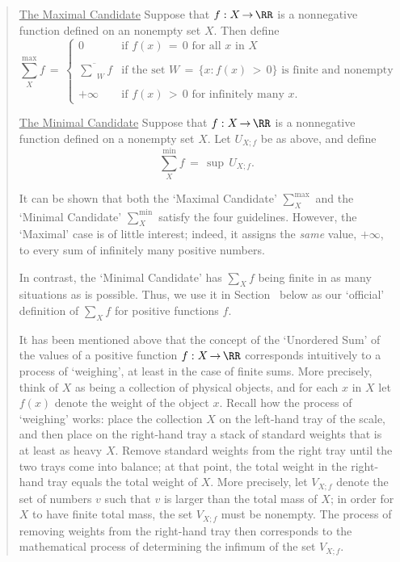 \begin{quotation}
{        \underline{The Maximal Candidate} Suppose that $f:X \,{\rightarrow}\, {\RR}$ is a nonnegative function defined on an nonempty set $X$.
    Then define
        \begin{displaymath}
        {\sum}_{X}^{\mbox{max}} f \,=\, \left\{
        \begin{array}{cl}
        0 & \mbox{if $f(x) \,=\, 0$ for all $x$ in $X$} \\
          &                                             \\
        {\displaystyle \overline{{\sum}}_{W} f} & \mbox{if the set $W \,=\, \{x:f(x)\,>\,0\}$ is finite and nonempty} \\
          &                                             \\
        +{\infty} & \mbox{if $f(x)\,>\,0$ for infinitely many $x$}.
        \end{array}
                                    \right.
        \end{displaymath}

        \underline{The Minimal Candidate} Suppose that $f:X \,{\rightarrow}\, {\RR}$ is a nonnegative function defined on a nonempty set $X$.
    Let $U_{X;f}$ be as above, and define
        \begin{displaymath}
        {\sum}_{X}^{\mbox{min}} f \,=\, {\sup}\,U_{X;f}.
        \end{displaymath}

        It can be shown that both the `Maximal Candidate' ${\sum}_{X}^{\mbox{max}}$ and the `Minimal Candidate' ${\sum}_{X}^{\mbox{min}}$ satisfy the four guidelines.
    However, the `Maximal' case is of little interest;
    indeed, it assigns the {\em same} value, $+{\infty}$, to every sum of infinitely many positive numbers.

        In contrast, the `Minimal Candidate' has ${\sum}_{X} f$ being finite in as many situations as is possible.
    Thus, we use it in Section~ below as our `official' definition of ${\sum}_{X} f$ for positive functions $f$.

\V

        It has been mentioned above that the concept of the `Unordered Sum' of the values of a positive function $f:X \,{\rightarrow}\, {\RR}$ corresponds intuitively to a process of `weighing', at least in the case of finite sums.
    More precisely, think of $X$ as being a collection of physical objects, and for each $x$ in $X$ let $f(x)$ denote the weight of the object $x$.
    Recall how the process of `weighing' works: place the collection $X$ on the left-hand tray of the scale,
    and then place on the right-hand tray a stack of standard weights that is at least as heavy $X$.
    Remove standard weights from the right tray until the two trays come into balance;
    at that point, the total weight in the right-hand tray equals the total weight of $X$.
    More precisely, let $V_{X;f}$ denote the set of numbers $v$ such that $v$ is larger than the total mass of $X$;
    in order for $X$ to have finite total mass, the set $V_{X;f}$ must be nonempty.
    The process of removing weights from the right-hand tray then corresponds to the mathematical process of determining the infimum of the set $V_{X;f}$.

}
\end{quotation}
